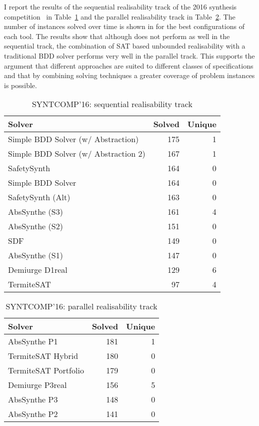I report the results of the sequential realisability track of the 2016 synthesis competition~ in Table~\ref{table:syntcomp16s} and the parallel realisability track in Table~\ref{table:syntcomp16p}. The number of instances solved over time is shown in  for the best configurations of each tool.  The results show that although \termitesat does not perform as well in the sequential track, the combination of SAT based unbounded realisability with a traditional BDD solver performs very well in the parallel track. This supports the argument that different approaches are suited to different classes of specifications and that by combining solving techniques a greater coverage of problem instances is possible.

\begin{table}
    \centering
    \begin{tabular}{l r r}
        \textbf{Solver} & \textbf{Solved} & \textbf{Unique} \\
        \hline
        Simple BDD Solver (w/ Abstraction) & 175 & 1 \\
        Simple BDD Solver (w/ Abstraction 2) & 167 & 1 \\
        SafetySynth & 164 & 0 \\
        Simple BDD Solver & 164 & 0 \\
        SafetySynth (Alt) & 163 & 0 \\
        AbsSynthe (S3) & 161 & 4 \\
        AbsSynthe (S2) & 151 & 0 \\
        SDF & 149 & 0 \\
        AbsSynthe (S1) & 147 & 0 \\
        Demiurge D1real & 129 & 6 \\
        TermiteSAT & 97 & 4 \\
    \end{tabular}
    \caption{SYNTCOMP'16: sequential realisability track}
    \label{table:syntcomp16s}
\end{table}

\begin{table}
    \centering
    \begin{tabular}{l r r}
        \textbf{Solver} & \textbf{Solved} & \textbf{Unique} \\
        \hline
        AbsSynthe P1 & 181 & 1 \\
        TermiteSAT Hybrid & 180 & 0 \\
        TermiteSAT Portfolio & 179 & 0 \\
        Demiurge P3real & 156 & 5 \\
        AbsSynthe P3 & 148 & 0 \\
        AbsSynthe P2 & 141 & 0 \\
    \end{tabular}
    \caption{SYNTCOMP'16: parallel realisability track}
    \label{table:syntcomp16p}
\end{table}

